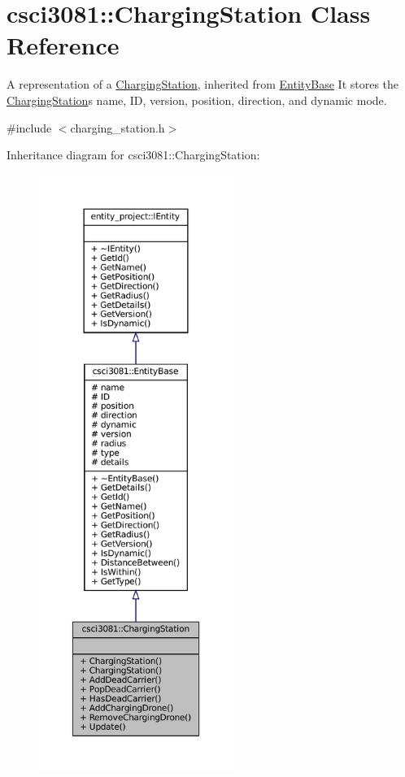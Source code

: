 \hypertarget{classcsci3081_1_1ChargingStation}{}\section{csci3081\+:\+:Charging\+Station Class Reference}
\label{classcsci3081_1_1ChargingStation}


A representation of a \hyperlink{classcsci3081_1_1ChargingStation}{Charging\+Station}, inherited from \hyperlink{classcsci3081_1_1EntityBase}{Entity\+Base} It stores the \hyperlink{classcsci3081_1_1ChargingStation}{Charging\+Station}\textquotesingle{}s name, ID, version, position, direction, and dynamic mode.  




{\ttfamily \#include $<$charging\+\_\+station.\+h$>$}



Inheritance diagram for csci3081\+:\+:Charging\+Station\+:
\nopagebreak
\begin{figure}[H]
\begin{center}
\leavevmode
\includegraphics[height=550pt]{classcsci3081_1_1ChargingStation__inherit__graph}
\end{center}
\end{figure}
